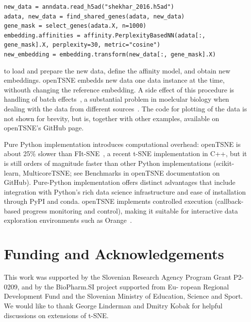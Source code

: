 \documentclass{bioinfo}
\begin{document}
\begin{lstlisting}
new_data = anndata.read_h5ad("shekhar_2016.h5ad")
adata, new_data = find_shared_genes(adata, new_data)
gene_mask = select_genes(adata.X, n=1000)
embedding.affinities = affinity.PerplexityBasedNN(adata[:, gene_mask].X, perplexity=30, metric="cosine")
new_embedding = embedding.transform(new_data[:, gene_mask].X)
\end{lstlisting}

\noindent to load and prepare the new data, define the affinity model, and obtain new embeddings. openTSNE embedds new data one data instance at the time, withouth changing the reference embedding. A side effect of this procedure is handling of batch effects~\cite{Pavlin2019-DS}, a substantial problem in moelcular biology when dealing with the data from different sources~\cite{batch-effects}. The code for plotting of the data is not shown for brevity, but is, together with other examples, available on openTSNE's GitHub page. 

Pure Python implementation introduces computational overhead: openTSNE is about 25\% slower than FIt-SNE~\citep{fi_tsne}, a recent t-SNE implementation in C++, but it is still orders of magnitude faster than other Python implementations (scikit-learn, MulticoreTSNE; see Benchmarks in openTSNE documentation on GitHub). Pure-Python implementation offers distinct advantages that include integration with Python's rich data science infrastructure and ease of installation through PyPI and conda. openTSNE implements controlled execution (callback-based progress monitoring and control), making it suitable for interactive data exploration environments such as Orange~\cite{scorange}.

\section*{Funding and Acknowledgements}
This work was supported by the Slovenian Research Agency Program Grant P2-0209, and by the BioPharm.SI project supported from Eu- ropean Regional Development Fund and the Slovenian Ministry of Education, Science and Sport. We would like to thank George Linderman and Dmitry Kobak for helpful discussions on extensions of t-SNE.




\end{document}
